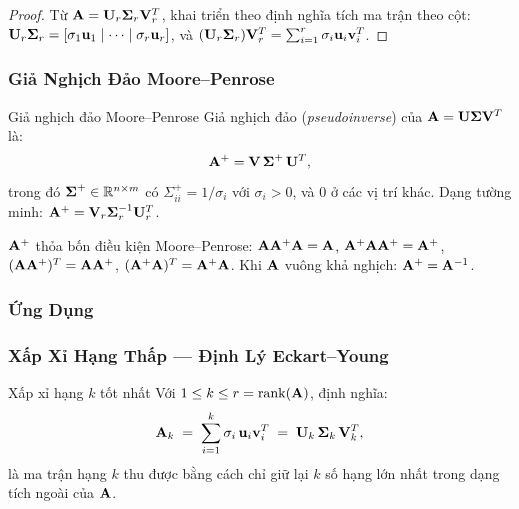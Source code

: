 \begin{proof}
Từ $\mathbf{A} = \mathbf{U}_r\boldsymbol{\Sigma}_r\mathbf{V}_r^T$, khai triển theo định nghĩa
tích ma trận theo cột:
$\mathbf{U}_r\boldsymbol{\Sigma}_r = [\sigma_1\mathbf{u}_1 \mid \cdots \mid \sigma_r\mathbf{u}_r]$,
và $(\mathbf{U}_r\boldsymbol{\Sigma}_r)\mathbf{V}_r^T = \sum_{i=1}^r \sigma_i\mathbf{u}_i\mathbf{v}_i^T$.
\end{proof}

\subsubsection{Giả Nghịch Đảo Moore--Penrose}

\begin{mydef}{Giả nghịch đảo Moore--Penrose}{}
Giả nghịch đảo (\textit{pseudoinverse}) của $\mathbf{A} = \mathbf{U}\boldsymbol{\Sigma}\mathbf{V}^T$
là:
\[
    \mathbf{A}^+ = \mathbf{V}\,\boldsymbol{\Sigma}^+\,\mathbf{U}^T,
\]
trong đó $\boldsymbol{\Sigma}^+ \in \mathbb{R}^{n \times m}$ có
$\Sigma^+_{ii} = 1/\sigma_i$ với $\sigma_i > 0$, và 0 ở các vị trí khác.
Dạng tường minh: $\mathbf{A}^+ = \mathbf{V}_r\boldsymbol{\Sigma}_r^{-1}\mathbf{U}_r^T$.
\end{mydef}

$\mathbf{A}^+$ thỏa bốn điều kiện Moore--Penrose: $\mathbf{A}\mathbf{A}^+\mathbf{A} = \mathbf{A}$,
$\mathbf{A}^+\mathbf{A}\mathbf{A}^+ = \mathbf{A}^+$, $(\mathbf{A}\mathbf{A}^+)^T = \mathbf{A}\mathbf{A}^+$,
$(\mathbf{A}^+\mathbf{A})^T = \mathbf{A}^+\mathbf{A}$. Khi $\mathbf{A}$ vuông khả nghịch:
$\mathbf{A}^+ = \mathbf{A}^{-1}$.

\subsubsection{Ứng Dụng}

\subsubsection{Xấp Xỉ Hạng Thấp --- Định Lý Eckart--Young}


\begin{mydef}{Xấp xỉ hạng $k$ tốt nhất}{}
Với $1 \leq k \leq r = \operatorname{rank}(\mathbf{A})$, định nghĩa:
\[
    \mathbf{A}_k \;=\; \sum_{i=1}^{k} \sigma_i\,\mathbf{u}_i\mathbf{v}_i^T
    \;=\; \mathbf{U}_k\,\boldsymbol{\Sigma}_k\,\mathbf{V}_k^T,
\]
là ma trận hạng $k$ thu được bằng cách chỉ giữ lại $k$ số hạng lớn nhất trong
dạng tích ngoài của $\mathbf{A}$.
\end{mydef}

